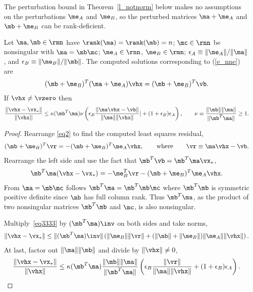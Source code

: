 \documentclass[final]{siamart220329}%
\begin{document}
The perturbation bound in Theorem~\ref{l_notnorm} below makes no  assumptions on the perturbations $\me_A$ and $\me_B$, so the perturbed matrices $\ma+\me_A$ and $\mb+\me_B$ can be rank-deficient.


\begin{theorem}\label{l_notnorm}
 Let $\ma,\mb\in\rmn$ have $\rank(\ma)=\rank(\mb)=n$;
 $\mc\in\rnn$ be nonsingular with $\ma=\mb\mc$; $\me_A\in\rnn$, $\me_B\in\rmn$; $\epsilon_A\equiv\|\me_A\|/\|\ma\|$, and
$\epsilon_B\equiv\|\me_B\|/\|\mb\|$.
 The computed solutions corresponding to (\ref{e_nne}) are
\begin{equation}\label{eq2}
 (\mb+\me_B)^T(\ma+\me_A)\vhx=(\mb+\me_B)^T\vb.
 \end{equation}
If $\vhx\neq\vzero$ then
    \begin{equation}\label{eqnotnorm}
        \frac{\|\vhx-\vx_*\|}{\|\vhx||}\leq \kappa(\mb^T\ma)\nu\left(\epsilon_B\frac{\|\ma\vhx-\vb\|}{\|\ma\|\|\vhx\|}|+(1+\epsilon_B)\epsilon_A\right), \qquad 
\nu\equiv\frac{\|\mb\|\|\ma\|}{\|\mb^T\ma\|}\geq 1.
    \end{equation}
\end{theorem}

\begin{proof}
Rearrange \eqref{eq2} to find the computed least squares residual,
    \begin{equation*}
        (\mb+\me_B)^T\vr=-(\mb+\me_B)^T\me_A\vhx,
        \qquad \text{where}\qquad \vr\equiv \ma\vhx-\vb.
    \end{equation*}
Rearrange the left side and use the fact that $\mb^T\vb=\mb^T\ma\vx_*$,
\begin{equation}\label{eq3333}
        \mb^T\ma(\vhx-\vx_*)=-\me_B^T\vr-(\mb+\me_B)^T\me_A\vhx.
    \end{equation}
From $\ma=\mb\mc$ follows $\mb^T\ma=\mb^T\mb\mc$ where
$\mb^T\mb$ is symmetric positive definite since $\mb$ has full column rank. Thus $\mb^T\ma$, as the product of two nonsingular matrices $\mb^T\mb$ and $\mc$, is also nonsingular. 

Multiply~\eqref{eq3333} by $(\mb^T\ma)\inv$ on both sides and take norms,
\begin{equation*}
        \|\vhx-\vx_*\|\leq\|(\mb^T\ma)\inv\|\left(\|\me_B\|\|\vr\|+(\|\mb\|+\|\me_B\|)\|\me_A\|\|\vhx\|\right). 
    \end{equation*}
At last, factor out $\|\ma\|\|\mb\|$ and divide by $\|\vhx\|\neq 0$,
        \begin{equation*}
        \frac{\|\vhx-\vx_*\|}{\|\vhx\|}\leq\kappa(\mb^T\ma)\frac{\|\mb\|\|\ma\|}{\|\mb^T\ma\|}\left(\epsilon_B\frac{\|\vr\|}{\|\ma\|\|\vhx\|}+(1+\epsilon_B)\epsilon_A\right).
    \end{equation*}
\end{proof}
\end{document}
